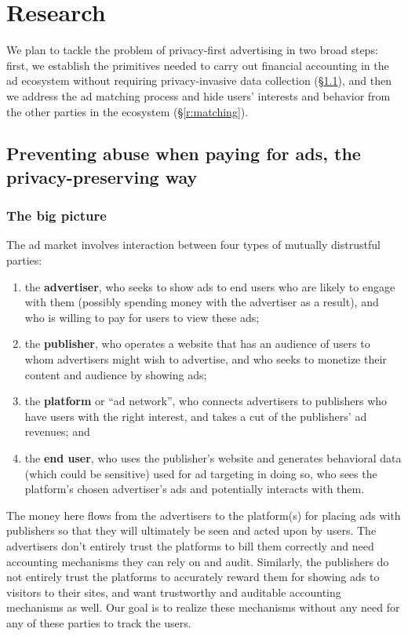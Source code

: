 \section{Research}
\label{r:stuff}

%
We plan to tackle the problem of privacy-first advertising in two broad steps:
first, we establish the primitives needed to carry out financial accounting in
the ad ecosystem without requiring privacy-invasive data
collection (\S\ref{r:fraud}), and then we address the ad matching process and
hide users' interests and behavior from the other parties in the ecosystem
(\S\ref{r:matching}).
%

\subsection{Preventing abuse when paying for ads, the privacy-preserving way}
\label{r:fraud}

\subsubsection{The big picture}
The ad market involves interaction between four types of mutually distrustful parties:
\begin{enumerate}
 \item the \textbf{advertiser}, who seeks to show ads to end users who
   are likely to engage with them (possibly spending money with the
   advertiser as a result), and who is willing to pay for users to view
   these ads;
 \item the \textbf{publisher}, who operates a website that has an audience
   of users to whom advertisers might wish to advertise, and who seeks
   to monetize their content and audience by showing ads;
 \item the \textbf{platform} or ``ad network'', who connects advertisers
   to publishers who have users with the right interest, and takes a cut
   of the publishers' ad revenues; and
 \item the \textbf{end user}, who uses the publisher's website and generates
   behavioral data (which could be sensitive) used for ad targeting in doing so,
   who sees the platform's chosen advertiser's ads and potentially interacts
   with them.
\end{enumerate}

The money here flows from the advertisers to the platform(s) for placing ads with publishers so that they will ultimately be seen and acted upon by users.  The advertisers don't entirely trust the platforms to bill them correctly and need accounting mechanisms they can rely on and audit.  Similarly, the publishers do not entirely trust the platforms to accurately reward them for showing ads to visitors to their sites, and want trustworthy and auditable accounting mechanisms as well.  Our goal is to realize these mechanisms without any need for any of these parties to track the users.  


